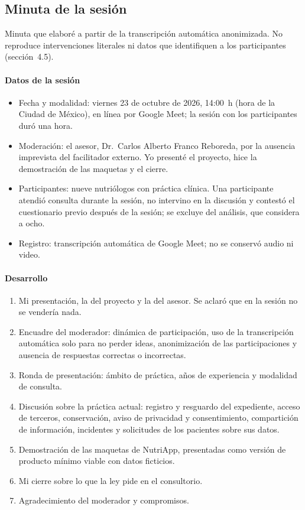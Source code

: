 \documentclass[12pt, a4paper]{article}
\begin{document}
\subsection{Minuta de la sesión}
\label{anexo:minuta}

Minuta que elaboré a partir de la transcripción automática anonimizada. No reproduce intervenciones literales ni datos que identifiquen a los participantes (sección~4.5).

\paragraph{Datos de la sesión}
\begin{itemize}[leftmargin=*,itemsep=1pt]
  \item Fecha y modalidad: viernes 23 de octubre de 2026, 14:00~h (hora de la Ciudad de México), en línea por Google Meet; la sesión con los participantes duró una hora.
  \item Moderación: el asesor, Dr.~Carlos Alberto Franco Reboreda, por la ausencia imprevista del facilitador externo. Yo presenté el proyecto, hice la demostración de las maquetas y el cierre.
  \item Participantes: nueve nutriólogos con práctica clínica. Una participante atendió consulta durante la sesión, no intervino en la discusión y contestó el cuestionario previo después de la sesión; se excluye del análisis, que considera a ocho.
  \item Registro: transcripción automática de Google Meet; no se conservó audio ni video.
\end{itemize}

\paragraph{Desarrollo}
\begin{enumerate}[leftmargin=*,itemsep=1pt]
  \item Mi presentación, la del proyecto y la del asesor. Se aclaró que en la sesión no se vendería nada.
  \item Encuadre del moderador: dinámica de participación, uso de la transcripción automática solo para no perder ideas, anonimización de las participaciones y ausencia de respuestas correctas o incorrectas.
  \item Ronda de presentación: ámbito de práctica, años de experiencia y modalidad de consulta.
  \item Discusión sobre la práctica actual: registro y resguardo del expediente, acceso de terceros, conservación, aviso de privacidad y consentimiento, compartición de información, incidentes y solicitudes de los pacientes sobre sus datos.
  \item Demostración de las maquetas de NutriApp, presentadas como versión de producto mínimo viable con datos ficticios.
  \item Mi cierre sobre lo que la ley pide en el consultorio.
  \item Agradecimiento del moderador y compromisos.
\end{enumerate}
\end{document}
